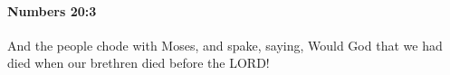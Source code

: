 
		\paragraph{Numbers 20:3} %
			\label{NUMBERS-20-3}

			And the people chode with Moses, and spake, saying, Would God that we had died when our brethren died before the LORD!


